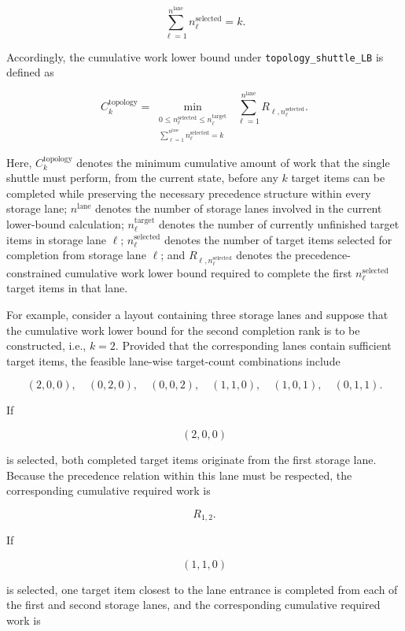 \[
\sum_{\ell=1}^{n^{\mathrm{lane}}}
n_{\ell}^{\mathrm{selected}}
=
k.
\]

Accordingly, the cumulative work lower bound under
\texttt{topology\_shuttle\_LB} is defined as

\begin{equation}
C_k^{\mathrm{topology}}
=
\min_{
\substack{
0
\leq
n_{\ell}^{\mathrm{selected}}
\leq
n_{\ell}^{\mathrm{target}}
\\
\sum_{\ell=1}^{n^{\mathrm{lane}}}
n_{\ell}^{\mathrm{selected}}
=
k
}
}
\;
\sum_{\ell=1}^{n^{\mathrm{lane}}}
R_{\ell,n_{\ell}^{\mathrm{selected}}}.
\end{equation}

Here, \(C_k^{\mathrm{topology}}\) denotes the minimum cumulative amount of work
that the single shuttle must perform, from the current state, before any
\(k\) target items can be completed while preserving the necessary precedence
structure within every storage lane;
\(n^{\mathrm{lane}}\) denotes the number of storage lanes involved in the
current lower-bound calculation;
\(n_{\ell}^{\mathrm{target}}\) denotes the number of currently unfinished target
items in storage lane \(\ell\);
\(n_{\ell}^{\mathrm{selected}}\) denotes the number of target items selected for
completion from storage lane \(\ell\); and
\(R_{\ell,n_{\ell}^{\mathrm{selected}}}\) denotes the
precedence-constrained cumulative work lower bound required to complete the
first \(n_{\ell}^{\mathrm{selected}}\) target items in that lane.

For example, consider a layout containing three storage lanes and suppose that
the cumulative work lower bound for the second completion rank is to be
constructed, i.e., \(k=2\). Provided that the corresponding lanes contain
sufficient target items, the feasible lane-wise target-count combinations
include

\[
(2,0,0),
\quad
(0,2,0),
\quad
(0,0,2),
\quad
(1,1,0),
\quad
(1,0,1),
\quad
(0,1,1).
\]

If

\[
(2,0,0)
\]

is selected, both completed target items originate from the first storage lane.
Because the precedence relation within this lane must be respected, the
corresponding cumulative required work is

\[
R_{1,2}.
\]

If

\[
(1,1,0)
\]

is selected, one target item closest to the lane entrance is completed from
each of the first and second storage lanes, and the corresponding cumulative
required work is

